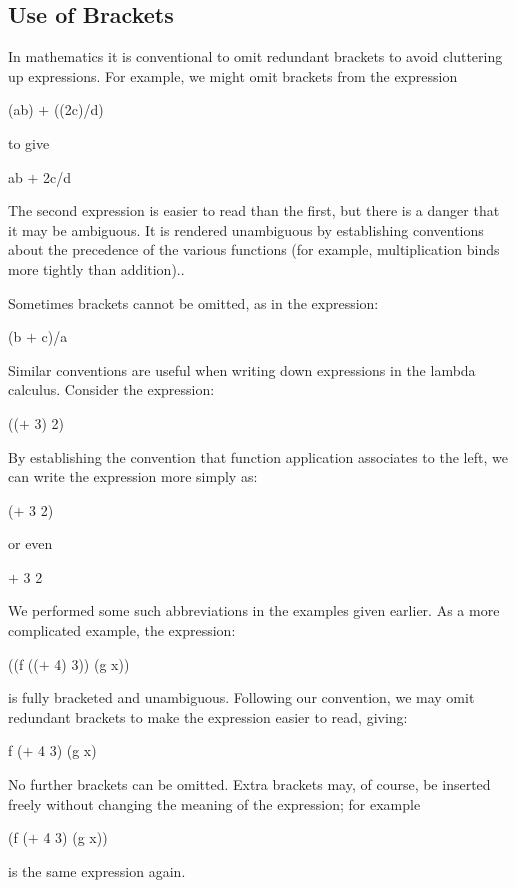 \subsection{Use of Brackets}

In mathematics it is conventional to omit redundant brackets to avoid
cluttering up expressions. For example, we might omit brackets from the
expression
\begin{mlcoded}
	(ab) $+$ ((2c)/d)
\end{mlcoded}
to give
\begin{mlcoded}
	ab $+$ 2c/d
\end{mlcoded}
The second expression is easier to read than the first, but there is a danger that
it may be ambiguous. It is rendered unambiguous by establishing conventions
about the precedence of the various functions (for example, multiplication
binds more tightly than addition)..

Sometimes brackets cannot be omitted, as in the expression:
\begin{mlcoded}
	(b $+$ c)/a
\end{mlcoded}
Similar conventions are useful when writing down expressions in the
lambda calculus. Consider the expression:
\begin{mlcoded}
	(($+$ 3) 2)
\end{mlcoded}
By establishing the convention that function application associates to the left,
we can write the expression more simply as:
\begin{mlcoded}
	($+$ 3 2)
\end{mlcoded}
or even
\begin{mlcoded}
    $+$ 3 2
\end{mlcoded}

We performed some such abbreviations in the examples given earlier. As a
more complicated example, the expression:
\begin{mlcoded}
	((f (($+$ 4) 3)) (g x))
\end{mlcoded}
is fully bracketed and unambiguous. Following our convention, we may omit
redundant brackets to make the expression easier to read, giving:
\begin{mlcoded}
	f ($+$ 4 3) (g x)
\end{mlcoded}
No further brackets can be omitted. Extra brackets may, of course, be
inserted freely without changing the meaning of the expression; for example
\begin{mlcoded}
	(f ($+$ 4 3) (g x))
\end{mlcoded}
is the same expression again.

